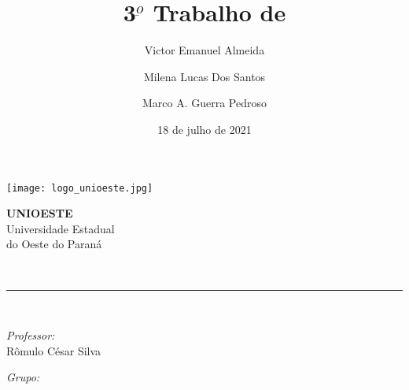 \documentclass[12pt, a4paper]{article}
\author{Victor Emanuel Almeida\and Milena Lucas Dos Santos\and Marco A. Guerra Pedroso}
\title{3$^{\underbar{o}}$ Trabalho de \materia}
\date{18 de julho de 2021}
\newcommand{\prof}{Rômulo César Silva}
\begin{document}
\begin{titlepage}
    \centering
    \thispagestyle{fancy}

    \begin{minipage}{0.4\textwidth}
        \begin{flushleft}
            \texttt{[image: logo\_unioeste.jpg]}\\[1.0 cm]
        \end{flushleft}
    \end{minipage}
    \begin{minipage}{0.5\textwidth}
        \begin{flushright}\large
            \textsc{\LARGE\textbf{UNIOESTE}}\\
            \vspace{1cm}
            Universidade Estadual\\do Oeste do Paraná
        \end{flushright}
    \end{minipage}
    \vspace*{4.5 cm}

    {\huge\bfseries\thetitle}\\
    \rule{\linewidth}{0.2 mm}\\[1.5 cm]

    \vspace{2cm}
    \begin{minipage}[t]{0.4\textwidth}
        \begin{flushleft}\large
            \emph{Professor:}\\
            \prof\\
        \end{flushleft}
    \end{minipage}
    \begin{minipage}[t]{0.5\textwidth}

        \begin{flushright}\large
            \emph{Grupo:}\\
            \theauthor
        \end{flushright}

    \end{minipage}\\[2 cm]

    \vfill\thedate
\end{titlepage}

\pagestyle{fancy}
\fancyfoot[L]{}
\fancyhead[L]{}
\fancyhead[R]{}
\end{document}
